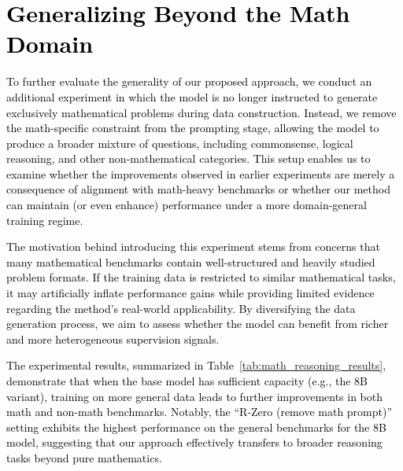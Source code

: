 \section{\textcolor{black}{Generalizing Beyond the Math Domain}}

\textcolor{black}{
To further evaluate the generality of our proposed approach, we conduct an additional experiment in which the model is no longer instructed to generate exclusively mathematical problems during data construction. Instead, we remove the math-specific constraint from the prompting stage, allowing the model to produce a broader mixture of questions, including commonsense, logical reasoning, and other non-mathematical categories. This setup enables us to examine whether the improvements observed in earlier experiments are merely a consequence of alignment with math-heavy benchmarks or whether our method can maintain (or even enhance) performance under a more domain-general training regime.
}

\textcolor{black}{
The motivation behind introducing this experiment stems from concerns that many mathematical benchmarks contain well-structured and heavily studied problem formats. If the training data is restricted to similar mathematical tasks, it may artificially inflate performance gains while providing limited evidence regarding the method’s real-world applicability. By diversifying the data generation process, we aim to assess whether the model can benefit from richer and more heterogeneous supervision signals.
}

\textcolor{black}{
The experimental results, summarized in Table~\ref{tab:math_reasoning_results}, demonstrate that when the base model has sufficient capacity (e.g., the 8B variant), training on more general data leads to further improvements in both math and non-math benchmarks. Notably, the ``R-Zero (remove math prompt)'' setting exhibits the highest performance on the general benchmarks for the 8B model, suggesting that our approach effectively transfers to broader reasoning tasks beyond pure mathematics.
}

